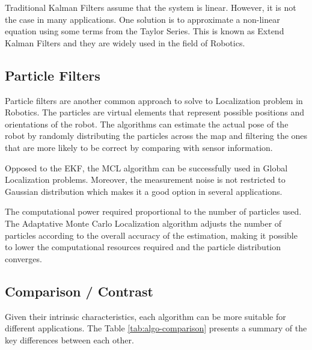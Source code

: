 \documentclass[10pt,journal,compsoc]{IEEEtran}
\begin{document}
Traditional Kalman Filters assume that the system is linear. However, it is not the case in many applications. One solution is to approximate a non-linear equation using some terms from the Taylor Series. This is known as Extend Kalman Filters and they are widely used in the field of Robotics.


\subsection{Particle Filters}
Particle filters are another common approach to solve to Localization problem in Robotics. The particles are virtual elements that represent possible positions and orientations of the robot. The algorithms can estimate the actual pose of the robot by randomly distributing the particles across the map and filtering the ones that are more likely to be correct by comparing with sensor information. 

Opposed to the EKF, the MCL algorithm can be successfully used in Global Localization problems. Moreover, the measurement noise is not restricted to Gaussian distribution which makes it a good option in several applications.

The computational power required proportional to the number of particles used. The Adaptative Monte Carlo Localization algorithm adjusts the number of particles according to the overall accuracy of the estimation, making it possible to lower the computational resources required and the particle distribution converges.


\subsection{Comparison / Contrast}
Given their intrinsic characteristics, each algorithm can be more suitable for different applications. The Table \ref{tab:algo-comparison} presents a summary of the key differences between each other. 
\end{document}
